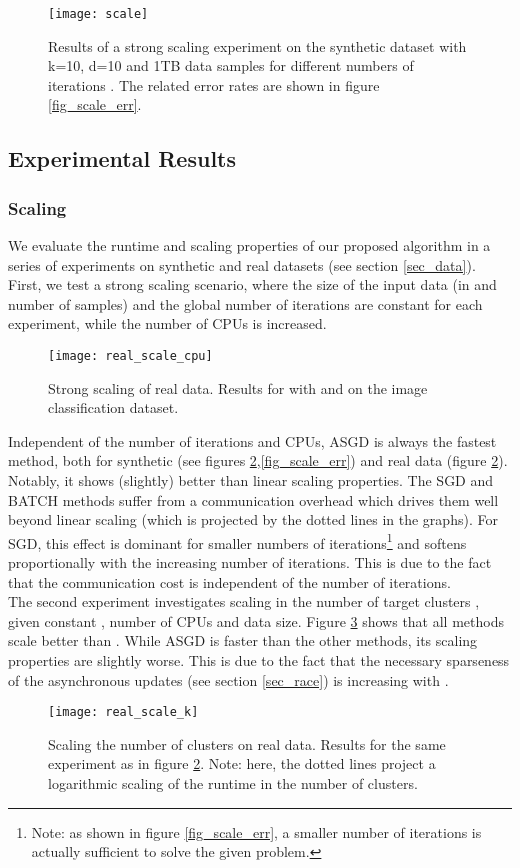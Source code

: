 \documentclass{acm_proc_article-sp}
\begin{document}
\begin{figure}[!t]
\texttt{[image: scale]}
\caption{Results of a strong scaling experiment on the synthetic dataset
with k=10, d=10 and 1TB data samples for different numbers of 
iterations . The related error rates are shown in figure 
\ref{fig_scale_err}.
\label{fig_eval_scaling}}
\end{figure}
\subsection{Experimental Results}
\subsubsection*{Scaling\label{sec_ex_scale}}
We evaluate the runtime and scaling properties of our proposed algorithm 
in a series of experiments on synthetic and real datasets (see section 
\ref{sec_data}). First, we test a strong scaling scenario, where the 
size of the input data (in  and number of samples) and the 
global number of iterations are constant for each experiment, 
while the number of CPUs is increased.
\begin{figure}[!ht]
\texttt{[image: real\_scale\_cpu]}
\caption{Strong scaling of real data. Results for with  
and  on the image classification dataset.                                               
\label{fig_eval_real_scaling}}
\end{figure}
Independent of the number of iterations and CPUs, ASGD is always
the fastest method, both for synthetic (see figures \ref{fig_eval_real_scaling},\ref{fig_scale_err})
 and real data (figure \ref{fig_eval_real_scaling}).
Notably, it shows (slightly) better than linear
scaling properties. The SGD and BATCH methods suffer from a
communication overhead which drives them well beyond linear scaling
(which is projected by the dotted lines in the graphs). 
For SGD, this effect is dominant for
smaller numbers of iterations\footnote{Note: as shown in figure \ref{fig_scale_err},
a smaller number of iterations is actually sufficient to solve the given problem.} 
and softens proportionally with the increasing number of iterations. This is
due to the fact that the communication cost is independent of the number of 
iterations.\\
The second experiment investigates scaling in the number of target clusters
, given constant , number of CPUs and data size. Figure 
\ref{fig_eval_real_k} shows that all methods scale better than
. While ASGD is faster than the other methods, its scaling properties are
slightly worse. This is due to the fact that the necessary sparseness of
the asynchronous updates (see section \ref{sec_race}) is increasing with
. 
\begin{figure}[!ht]
\texttt{[image: real\_scale\_k]}
\caption{Scaling the number of clusters  on real data. Results
for the same experiment as in figure \ref{fig_eval_real_scaling}.
Note: here, the dotted lines project
a logarithmic scaling of the runtime in the number of clusters.
\label{fig_eval_real_k}}
\end{figure}
\newpage
\end{document}
